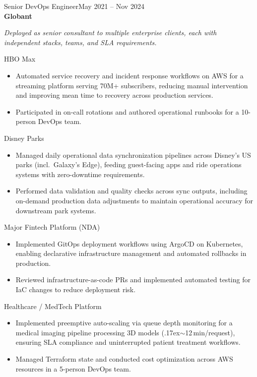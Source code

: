 \documentclass[a4paper,9pt]{extarticle}
\newcommand{\jobentry}[4]{%
  {\mediumfont\color{darktext}#1}\hfill{\small\color{graytext}#4}\\
  {\color{accent}\textbf{#2}}\enspace{\small\color{graytext}| #3}\par\vspace{0.2em}
}
\begin{document}
\jobentry{Senior DevOps Engineer}{Globant}{Bogot\'{a}, Colombia}{May 2021 -- Nov 2024}
{\small\color{graytext}\textit{Deployed as senior consultant to multiple enterprise clients, each with independent stacks, teams, and SLA requirements.}}

\vspace{0.2em}
{\small\mediumfont\color{accent}HBO Max}
\begin{itemize}
  \item Automated service recovery and incident response workflows on AWS for a streaming platform serving 70M+ subscribers, reducing manual intervention and improving mean time to recovery across production services.
  \item Participated in on-call rotations and authored operational runbooks for a 10-person DevOps team.
\end{itemize}

\vspace{0.15em}
{\small\mediumfont\color{accent}Disney Parks}
\begin{itemize}
  \item Managed daily operational data synchronization pipelines across Disney's US parks (incl.\ Galaxy's Edge), feeding guest-facing apps and ride operations systems with zero-downtime requirements.
  \item Performed data validation and quality checks across sync outputs, including on-demand production data adjustments to maintain operational accuracy for downstream park systems.
\end{itemize}

\vspace{0.15em}
{\small\mediumfont\color{accent}Major Fintech Platform (NDA)}
\begin{itemize}
  \item Implemented GitOps deployment workflows using ArgoCD on Kubernetes, enabling declarative infrastructure management and automated rollbacks in production.
  \item Reviewed infrastructure-as-code PRs and implemented automated testing for IaC changes to reduce deployment risk.
\end{itemize}

\vspace{0.15em}
{\small\mediumfont\color{accent}Healthcare / MedTech Platform}
\begin{itemize}
  \item Implemented preemptive auto-scaling via queue depth monitoring for a medical imaging pipeline processing 3D models (\raise.17ex\hbox{$\scriptstyle\sim$}12\,min/request), ensuring SLA compliance and uninterrupted patient treatment workflows.
  \item Managed Terraform state and conducted cost optimization across AWS resources in a 5-person DevOps team.
\end{itemize}
\end{document}
